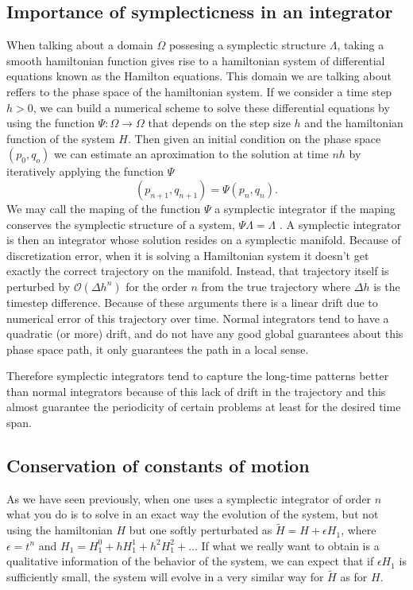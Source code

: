 \subsection{Importance of symplecticness in an integrator}
When talking about a domain $\Omega$ possesing a symplectic structure $\Lambda$, taking a smooth hamiltonian function gives rise to a hamiltonian system of differential equations known as the Hamilton equations. This domain we are talking about reffers to the phase space of the hamiltonian system. If we consider a time step $h>0$, we can build a numerical scheme to solve these differential equations by using the function $\Psi :\Omega \rightarrow \Omega$ that depends on the step size $h$ and the hamiltonian function of the system $H$. Then given an initial condition on the phase space $(p_0,q_o)$ we can estimate an aproximation to the solution at time $nh$ by iteratively applying the function $\Psi$
\begin{equation}
(p_{n+1},q_{n+1})=\Psi(p_{n},q_{n}).
\end{equation}
We may call the maping of the function $\Psi$ a symplectic integrator if the maping conserves the symplectic structure of a system, $\Psi \Lambda=\Lambda$\cite{markiewicz1999survey}\cite{de1956methods}\cite{ruth1983canonical} \cite{channell1983symplectic}.
A symplectic integrator is then an integrator whose solution resides on a symplectic manifold. Because of discretization error, when it is solving a Hamiltonian system it doesn't get exactly the correct trajectory on the manifold. Instead, that trajectory itself is perturbed by $\mathcal{O}(\Delta h^n)$ for the order $n$ from the true trajectory where $\Delta h$ is the timestep difference. Because of these arguments there is a linear drift due to numerical error of this trajectory over time. Normal integrators tend to have a quadratic (or more) drift, and do not have any good global guarantees about this phase space path, it only guarantees the path in a local sense.\par




Therefore symplectic integrators tend to capture the long-time patterns better than normal integrators because of this lack of drift in the trajectory and this almost guarantee the periodicity of certain problems at least for the desired time span. 

\subsection{Conservation of constants of motion}
As we have seen previously, when one uses a symplectic integrator of order $n$ what you do is to solve in an exact way the evolution of the system, but not using the hamiltonian $H$ but one softly perturbated as $\tilde{H}=H+\epsilon H_1$, where $\epsilon=t^n$ and $H_1=H_1^0+hH_1^1+h^2H_1^2+...$ If what we really want to obtain is a qualitative information of the behavior of the system, we can expect that if $\epsilon H_1$ is sufficiently small, the system will evolve in a very similar way for $\tilde{H}$ as for $H$.\par

